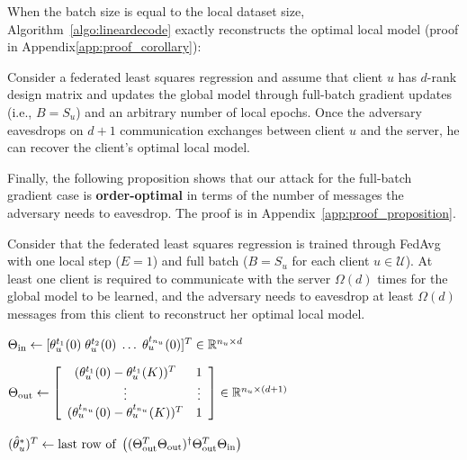 When the batch size is equal to the local dataset size, Algorithm~\ref{algo:lineardecode} exactly reconstructs the optimal local model (proof in Appendix\ref{app:proof_corollary}):

\begin{prop}\label{cor:linear_reconstruction}
Consider a federated least squares regression and assume that client $u$ has $d$-rank design matrix and updates the global model through full-batch gradient updates (i.e., $B=S_u$) and an arbitrary number of local epochs. Once the adversary eavesdrops on $d+1$ communication exchanges between client $u$ and the server, he can recover the client's optimal local model.
\end{prop}

Finally, the following proposition shows that 
our attack for the full-batch gradient case is \textbf{order-optimal} in terms of the number of messages the adversary needs to eavesdrop. The proof is in Appendix~\ref{app:proof_proposition}.

\begin{prop}\label{prop:order-optimal}
Consider that the federated least squares regression is trained through FedAvg with one local step ($E=1$) and full batch ($B=S_u$ for each client $u \in \mathcal{U}$). At least one client is required to communicate with the server $\Omega(d)$ times for the global model to be learned, and the adversary needs to eavesdrop at least $\Omega(d)$ messages from this client to reconstruct her optimal local model.
\end{prop}

\begin{algorithm2e}[H]
\caption{Reconstruction of client-$u$ local model by a passive adversary for federated least-squares regression}
\label{algo:lineardecode}

$\Theta_{\text{in}} \leftarrow [\theta_u^{t_1}(0)\; \theta_u^{t_2}(0)\; \dots\; \theta_u^{t_{n_u}}(0)]^T \in \mathbb{R}^{n_u \times d}$\;

$\Theta_{\text{out}} \leftarrow
\left[
\begin{array}{cc}
(\theta_u^{t_1}(0)-\theta_u^{t_1}(K))^T & 1 \\
\vdots & \vdots \\
(\theta_u^{t_{n_u}}(0)-\theta_u^{t_{n_u}}(K))^T & 1
\end{array}
\right] \in \mathbb{R}^{n_u \times (d+1)}$\;

$(\hat{\theta}_u^*)^T \leftarrow \text{last row of }\left((\Theta_{\text{out}}^T \Theta_{\text{out}})^\dagger \Theta_{\text{out}}^T \Theta_{\text{in}}\right)$\;
\label{algoline:ols}

\;
\end{algorithm2e}

